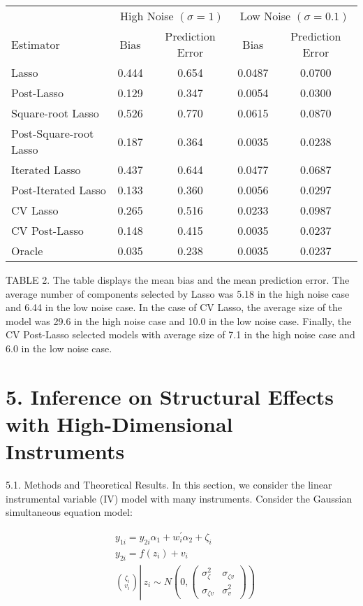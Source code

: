 \documentclass[10pt]{article}
\begin{document}
\begin{center}
\begin{tabular}{lcccc}
\hline
 & \multicolumn{2}{c}{High Noise \((\sigma=1)\)} & \multicolumn{2}{c}{Low Noise \((\sigma=0.1)\)} \\
Estimator & Bias & Prediction Error & Bias & Prediction Error \\
\hline
Lasso & 0.444 & 0.654 & 0.0487 & 0.0700 \\
Post-Lasso & 0.129 & 0.347 & 0.0054 & 0.0300 \\
Square-root Lasso & 0.526 & 0.770 & 0.0615 & 0.0870 \\
Post-Square-root Lasso & 0.187 & 0.364 & 0.0035 & 0.0238 \\
Iterated Lasso & 0.437 & 0.644 & 0.0477 & 0.0687 \\
Post-Iterated Lasso & 0.133 & 0.360 & 0.0056 & 0.0297 \\
CV Lasso & 0.265 & 0.516 & 0.0233 & 0.0987 \\
CV Post-Lasso & 0.148 & 0.415 & 0.0035 & 0.0237 \\
Oracle & 0.035 & 0.238 & 0.0035 & 0.0237 \\
\hline
\end{tabular}
\end{center}

TABLE 2. The table displays the mean bias and the mean prediction error. The average number of components selected by Lasso was 5.18 in the high noise case and 6.44 in the low noise case. In the case of CV Lasso, the average size of the model was 29.6 in the high noise case and 10.0 in the low noise case. Finally, the CV Post-Lasso selected models with average size of 7.1 in the high noise case and 6.0 in the low noise case.

\section*{5. Inference on Structural Effects with High-Dimensional Instruments}
5.1. Methods and Theoretical Results. In this section, we consider the linear instrumental variable (IV) model with many instruments. Consider the Gaussian simultaneous equation model:

\[
\begin{aligned}
& y_{1 i}=y_{2 i} \alpha_{1}+w_{i}^{\prime} \alpha_{2}+\zeta_{i} \\
& y_{2 i}=f\left(z_{i}\right)+v_{i} \\
& \binom{\zeta_{i}}{v_{i}} \left\lvert\, z_{i} \sim N\left(0,\left(\begin{array}{cc}
\sigma_{\zeta}^{2} & \sigma_{\zeta v} \\
\sigma_{\zeta v} & \sigma_{v}^{2}
\end{array}\right)\right)\right.
\end{aligned}
\]
\end{document}
